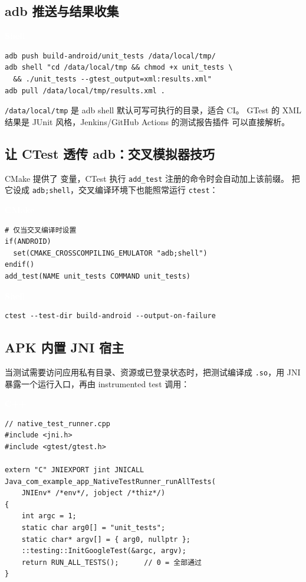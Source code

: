 \documentclass[12pt,a4paper,fontset=fandol]{ctexbook}
\newcommand{\cpplabel}{%
  \begin{tcolorbox}[enhanced,colback=cppheadbg,colframe=cppheadbg,
    arc=1mm,boxrule=0mm,left=6pt,right=6pt,top=2pt,bottom=2pt,
    halign=left,oversize]
    \textcolor{white}{\small\bfseries C++}
  \end{tcolorbox}\vspace{-4pt}}
\newcommand{\bashlabel}{%
  \begin{tcolorbox}[enhanced,colback=black!80,colframe=black!80,
    arc=1mm,boxrule=0mm,left=6pt,right=6pt,top=2pt,bottom=2pt,
    halign=left,oversize]
    \textcolor{white}{\small\bfseries Shell}
  \end{tcolorbox}\vspace{-4pt}}
\newcommand{\cmakelabel}{%
  \begin{tcolorbox}[enhanced,colback=cmakeheadbg,colframe=cmakeheadbg,
    arc=1mm,boxrule=0mm,left=6pt,right=6pt,top=2pt,bottom=2pt,
    halign=left,oversize]
    \textcolor{white}{\small\bfseries CMake}
  \end{tcolorbox}\vspace{-4pt}}
\begin{document}
\subsection{adb 推送与结果收集}

\bashlabel
\begin{lstlisting}
adb push build-android/unit_tests /data/local/tmp/
adb shell "cd /data/local/tmp && chmod +x unit_tests \
  && ./unit_tests --gtest_output=xml:results.xml"
adb pull /data/local/tmp/results.xml .
\end{lstlisting}

\begin{note}
\texttt{/data/local/tmp} 是 adb shell 默认可写可执行的目录，适合 CI。
GTest 的 XML 结果是 JUnit 风格，Jenkins/GitHub Actions 的测试报告插件
可以直接解析。
\end{note}

\subsection{让 CTest 透传 adb：交叉模拟器技巧}

CMake 提供了
变量，CTest 执行 \texttt{add\_test} 注册的命令时会自动加上该前缀。
把它设成 \texttt{adb;shell}，交叉编译环境下也能照常运行 \texttt{ctest}：

\cmakelabel
\begin{lstlisting}
# 仅当交叉编译时设置
if(ANDROID)
  set(CMAKE_CROSSCOMPILING_EMULATOR "adb;shell")
endif()
add_test(NAME unit_tests COMMAND unit_tests)
\end{lstlisting}

\bashlabel
\begin{lstlisting}
ctest --test-dir build-android --output-on-failure
\end{lstlisting}

\subsection{APK 内置 JNI 宿主}

当测试需要访问应用私有目录、资源或已登录状态时，把测试编译成
\texttt{.so}，用 JNI 暴露一个运行入口，再由 instrumented test 调用：

\cpplabel
\begin{lstlisting}
// native_test_runner.cpp
#include <jni.h>
#include <gtest/gtest.h>

extern "C" JNIEXPORT jint JNICALL
Java_com_example_app_NativeTestRunner_runAllTests(
    JNIEnv* /*env*/, jobject /*thiz*/)
{
    int argc = 1;
    static char arg0[] = "unit_tests";
    static char* argv[] = { arg0, nullptr };
    ::testing::InitGoogleTest(&argc, argv);
    return RUN_ALL_TESTS();      // 0 = 全部通过
}
\end{lstlisting}
\end{document}
